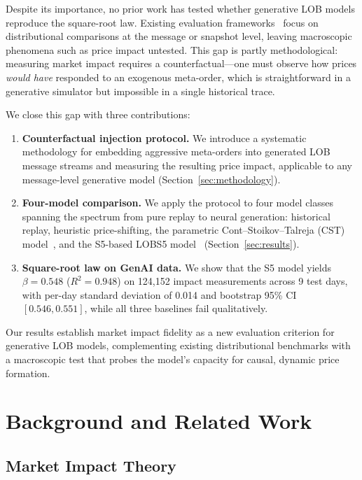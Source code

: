 \documentclass[sigplan,screen,anonymous]{acmart}
\begin{document}
Despite its importance, no prior work has tested whether generative LOB models reproduce the square-root law. Existing evaluation frameworks~\cite{cont2001empirical} focus on distributional comparisons at the message or snapshot level, leaving macroscopic phenomena such as price impact untested. This gap is partly methodological: measuring market impact requires a counterfactual---one must observe how prices \emph{would have} responded to an exogenous meta-order, which is straightforward in a generative simulator but impossible in a single historical trace.

We close this gap with three contributions:
\begin{enumerate}
  \item \textbf{Counterfactual injection protocol.} We introduce a systematic methodology for embedding aggressive meta-orders into generated LOB message streams and measuring the resulting price impact, applicable to any message-level generative model (Section~\ref{sec:methodology}).
  \item \textbf{Four-model comparison.} We apply the protocol to four model classes spanning the spectrum from pure replay to neural generation: historical replay, heuristic price-shifting, the parametric Cont--Stoikov--Talreja (CST) model~\cite{stoikov2008option}, and the S5-based LOBS5 model~\cite{nagy2023generative} (Section~\ref{sec:results}).
  \item \textbf{Square-root law on GenAI data.} We show that the S5 model yields $\beta = 0.548$ ($R^2 = 0.948$) on 124{,}152 impact measurements across 9 test days, with per-day standard deviation of 0.014 and bootstrap 95\% CI $[0.546, 0.551]$, while all three baselines fail qualitatively.
\end{enumerate}

Our results establish market impact fidelity as a new evaluation criterion for generative LOB models, complementing existing distributional benchmarks with a macroscopic test that probes the model's capacity for causal, dynamic price formation.


\section{Background and Related Work}

\subsection{Market Impact Theory}
\end{document}
